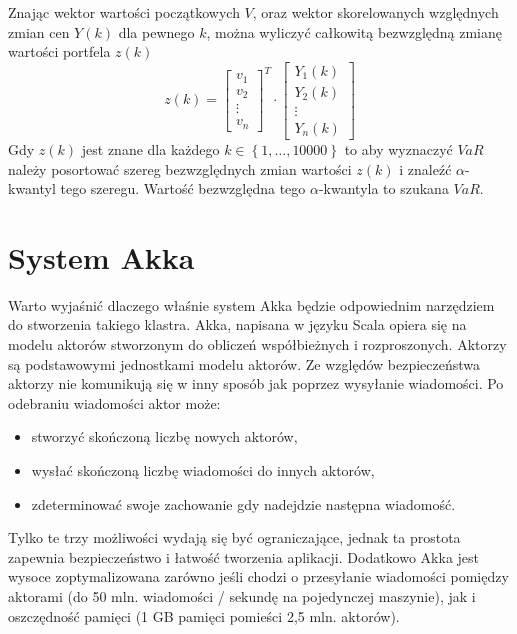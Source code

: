 \documentclass[12pt,titlepage]{article}
\numberwithin{equation}{section}
\begin{document}
Znając wektor wartości początkowych $V$, oraz wektor skorelowanych względnych zmian cen $Y(k)$ dla pewnego $k$, można wyliczyć całkowitą bezwzględną zmianę wartości portfela $z(k)$
\begin{equation} \label{eq:zk}
    z(k) = \begin{bmatrix}
 v_1 \\ 
 v_2 \\
\vdots \\
v_n
\end{bmatrix}^T \cdot 
 \begin{bmatrix}
 Y_1(k) \\ 
  Y_2(k) \\
\vdots \\
Y_n(k)
\end{bmatrix}
\end{equation}
Gdy $z(k)$ jest znane dla każdego $k \in \left \{1, \hdots, 10000 \right \} $ to aby wyznaczyć $VaR$ należy posortować szereg bezwzględnych zmian wartości $z(k)$ i znaleźć $\alpha$-kwantyl tego szeregu. Wartość bezwzględna tego $\alpha$-kwantyla to szukana $VaR$.

\newpage
\section{System Akka}
Warto wyjaśnić dlaczego właśnie system Akka będzie odpowiednim narzędziem do stworzenia takiego klastra. Akka, napisana w języku Scala opiera się na modelu aktorów stworzonym do obliczeń współbieżnych i rozproszonych. Aktorzy są podstawowymi jednostkami modelu aktorów. Ze względów bezpieczeństwa aktorzy nie komunikują się w inny sposób jak poprzez wysyłanie wiadomości. Po odebraniu wiadomości aktor może:

\begin{itemize}
  \item stworzyć skończoną liczbę nowych aktorów,
	\item wysłać skończoną liczbę wiadomości do innych aktorów,
	\item zdeterminować swoje zachowanie gdy nadejdzie następna wiadomość.

\end{itemize}
Tylko te trzy możliwości wydają się być ograniczające, jednak ta prostota zapewnia bezpieczeństwo i łatwość tworzenia aplikacji. 
Dodatkowo Akka jest wysoce zoptymalizowana zarówno jeśli chodzi o przesyłanie wiadomości pomiędzy aktorami (do 50 mln. wiadomości / sekundę na pojedynczej maszynie), jak i oszczędność pamięci (1 GB pamięci pomieści 2,5 mln. aktorów). 
\end{document}

